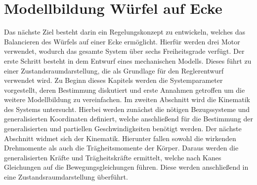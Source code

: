 \ifx\FORMAT\undefined


\fi

\chapter{Modellbildung Würfel auf Ecke}\label{chapter_TM_Corner}
Das nächste Ziel besteht darin ein Regelungskonzept zu entwickeln, welches das Balancieren des Würfels auf einer Ecke ermöglicht. Hierfür werden drei Motor verwendet, wodurch das gesamte System über sechs Freiheitsgrade verfügt. Der erste Schritt besteht in dem Entwurf eines mechanischen Modells. Dieses führt zu einer Zustandsraumdarstellung, die als Grundlage für den Reglerentwurf verwendet wird.
Zu Beginn dieses Kapitels werden die Systemparameter vorgestellt, deren Bestimmung diskutiert und erste Annahmen getroffen um die weitere Modellbildung zu vereinfachen. Im zweiten Abschnitt wird die Kinematik des Systems untersucht. Hierbei werden zunächst die nötigen Bezugssysteme und generalisierten Koordinaten definiert, welche anschließend für die Bestimmung der generalisierten und partiellen Geschwindigkeiten benötigt werden.
Der nächste Abschnitt widmet sich der Kinematik. Hierunter fallen sowohl die wirkenden Drehmomente als auch die Trägheitsmomente der Körper. Daraus werden die generalisierten Kräfte und Trägheitskräfte ermittelt, welche nach Kanes Gleichungen auf die Bewegungsgleichungen führen. Diese werden anschließend in eine Zustandsraumdarstellung überführt.
\newpage

\newpage

\newpage


\ifx\FORMAT\undefined

\fi